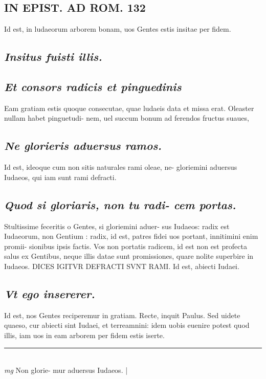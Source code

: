 \documentclass{article}
\begin{document}
\begin{pages}
\section*{IN EPIST. AD ROM.  132 }
\marginpar{[ p.]}\pstart Id est, in ludaeorum arborem bonam, uos Gentes estis insitae per fidem.  \pend
{}
{}
\subsection*{\textit{Insitus fuisti illis. }}
{}
\subsection*{\textit{Et consors radicis et pinguedinis }}\pstart Eam gratiam estis quoque consecutae, quae ludaeis data et missa erat. Oleaster nullam habet pinguetudi- nem, uel succum bonum ad ferendos fructus suaues,  \pend
{}
{}
\subsection*{\textit{Ne glorieris aduersus ramos. }}\pstart Id est, ideoque cum non sitis naturales rami oleae, ne- gloriemini aduersus Iudaeos, qui iam sunt rami defracti.  \pend
{}
{}
\subsection*{\textit{Quod si gloriaris, non tu radi- cem portas. }}\pstart Stultissime feceritis o Gentes, si gloriemini aduer- sus Iudaeos: radix est Iudaeorum, non Gentium : radix, id est, patres fidei uos portant, innitimini enim promii- sionibus ipsis factis. Vos non portatis radicem, id est non est profecta salus ex Gentibus, neque illis datae sunt promissiones, quare nolite superbire in Iudaeos.  DICES IGITVR DEFRACTI SVNT RAMI. Id est, abiecti Iudaei.  \pend
{}
{}
\subsection*{\textit{Vt ego insererer. }}\pstart Id est, nos Gentes reciperemur in gratiam. Recte, inquit Paulus. Sed uidete quaeso, cur abiecti sint Iudaei, et terreamnini: idem uobis euenire potest quod illis, iam uos in eam arborem per fidem estis iserte.  \pend
\vspace{0.5cm}\noindent
\vspace{0.2cm}\rule{1cm}{0.2pt}\\ 
\hspace{0.2cm}\textit{mg}
\footnotesize Non glorie- mur aduersus Iudaeos.  
\normalsize| 

\end{pages}
\end{document}

